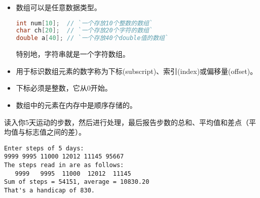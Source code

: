 \begin{frame}[fragile]\ft{\secname}
\begin{itemize}
\item
数组可以是任意数据类型。
\begin{lstlisting}[language=c,backgroundcolor=\color{red!10}]
int num[10];  // `一个存放10个整数的数组`
char ch[20];  // `一个存放20个字符的数组`
double a[40]; // `一个存放40个double值的数组`
\end{lstlisting}
特别地，字符串就是一个字符数组。
\end{itemize}
\end{frame}

\begin{frame}[fragile]\ft{\secname}
\begin{itemize}
\item
用于标识数组元素的数字称为下标(subscript)、索引(index)或偏移量(offset)。
\\[0.1in]
\item 下标必须是整数，它从0开始。\\[0.1in]
\item 数组中的元素在内存中是顺序存储的。
\end{itemize}
\end{frame}

\begin{frame}[fragile]
\begin{free}[例]{}
读入你5天运动的步数，然后进行处理，最后报告步数的总和、平均值和差点（平均值与标志值之间的差）。
\end{free}
\end{frame}


\begin{frame}\ft{\secname}

\end{frame}


\begin{frame}[fragile]\ft{\secname}
  \begin{lstlisting}
Enter steps of 5 days:
9999 9995 11000 12012 11145 95667
The steps read in are as follows:
   9999   9995  11000  12012  11145
Sum of steps = 54151, average = 10830.20
That's a handicap of 830.
\end{lstlisting}
\end{frame}
 

